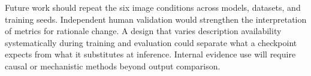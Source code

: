 Future work should repeat the six image conditions across models, datasets, and
training seeds. Independent human validation would strengthen the interpretation
of metrics for rationale change. A design that varies description availability
systematically during training and evaluation could separate what a checkpoint
expects from what it substitutes at inference. Internal evidence use will
require causal or mechanistic methods beyond output comparison.
